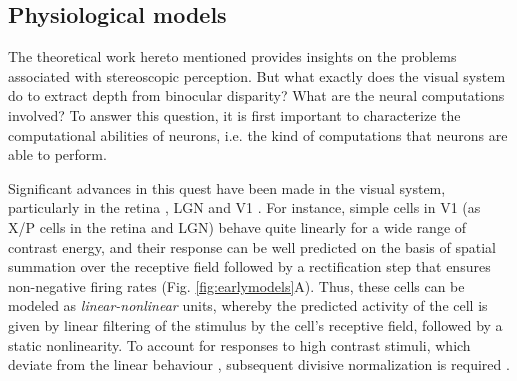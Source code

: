 \subsection{Physiological models}


The theoretical work hereto mentioned provides insights on the problems associated with stereoscopic perception. But what exactly does the visual system do to extract depth from binocular disparity? What are the neural computations involved? To answer this question, it is first important to characterize the computational abilities of neurons, i.e. the kind of computations that neurons are able to perform. 

Significant advances in this quest have been made in the visual system, particularly in the retina \cite{Enroth-Cugell:1966zr}, LGN \cite{Shapley:1975aa} and V1 \cite{Movshon:1978dq}. For instance, simple cells in V1 (as X/P cells in the retina and LGN) behave quite linearly for a wide range of contrast energy, and their response can be well predicted on the basis of spatial summation over the receptive field followed by a rectification step that ensures non-negative firing rates \cite{Movshon:1978dq} (Fig. \ref{fig:earlymodels}A). Thus, these cells can be modeled as \textit{linear-nonlinear} units, whereby the predicted activity of the cell is given by linear filtering of the stimulus by the cell's receptive field, followed by a static nonlinearity. To account for responses to high contrast stimuli, which deviate from the linear behaviour \cite{Maffei:1973aa}, subsequent divisive normalization is required \cite{Carandini97linearityand}.

